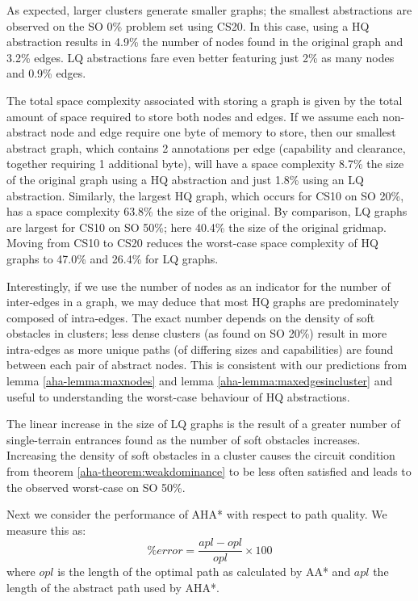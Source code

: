 As expected, larger clusters generate smaller graphs; the smallest abstractions are observed on the SO 0\% problem set using CS20. 
In this case, using a HQ abstraction results in 4.9\% the number of nodes found in the original graph and 3.2\% edges. 
LQ abstractions fare even better featuring just 2\% as many nodes and 0.9\% edges.
\par \indent
The total space complexity associated with storing a graph is given by the total amount of space required to store both nodes and edges.
If we assume each non-abstract node and edge require one byte of memory to store, then our smallest abstract graph, which contains 2 annotations per edge (capability and clearance, together requiring 1 additional byte), will have a space complexity 8.7\% the size of the original graph using a HQ abstraction and just 1.8\% using an LQ abstraction.
Similarly, the largest HQ graph, which occurs for CS10 on SO 20\%, has a space complexity 63.8\% the size of the original.
By comparison, LQ graphs are largest for CS10 on SO 50\%; here 40.4\% the size of the original gridmap.
Moving from CS10 to CS20 reduces the worst-case space complexity of HQ graphs to 47.0\% and 26.4\% for LQ graphs.
\par \indent
Interestingly, if we use the number of nodes as an indicator for the number of inter-edges in a graph, we may deduce that most HQ graphs are predominately composed of intra-edges. 
The exact number depends on the density of soft obstacles in clusters; less dense clusters (as found on SO 20\%) result in more intra-edges as more unique paths (of differing sizes and capabilities) are found between each pair of abstract nodes. 
This is consistent with our predictions from lemma \ref{aha-lemma:maxnodes} and lemma \ref{aha-lemma:maxedgesincluster} and useful to understanding the worst-case behaviour of HQ abstractions.
\par \indent
The linear increase in the size of LQ graphs is the result of a greater number of single-terrain entrances found as the number of soft obstacles increases.
Increasing the density of soft obstacles in a cluster causes the circuit condition from theorem \ref{aha-theorem:weakdominance} to be less often satisfied and leads to the observed worst-case on SO 50\%.
\par \indent
Next we consider the performance of AHA* with respect to path quality. We measure this as:
$$ \%error = \frac{apl - opl}{opl} \times 100 $$ where $opl$ is the length of the optimal path as calculated by AA* and $apl$ the length of the abstract path used by AHA*.
